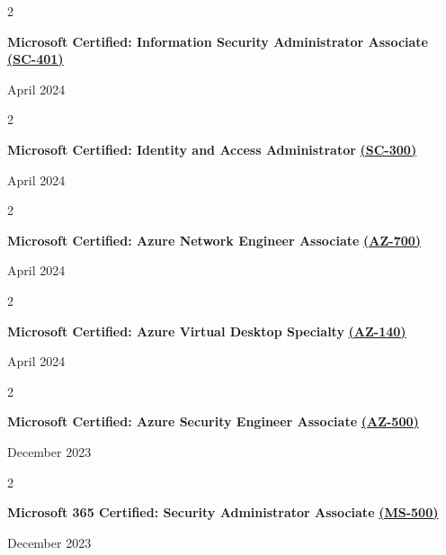 \documentclass[10pt, letterpaper]{article}
\newenvironment{twocolentry}[2][]{
    \onecolentry
    \def\secondColumn{#2}
    \setcolumnwidth{\fill, 4.5 cm}
    \begin{paracol}{2}
}{
    \switchcolumn \raggedleft \secondColumn
    \end{paracol}
    \endonecolentry
}
\begin{document}
\vspace{0.2 cm}

\begin{twocolentry}{April 2024}
    \textbf{Microsoft Certified: Information Security Administrator Associate} \href{https://learn.microsoft.com/api/credentials/share/en-in/ChinmayDhokMAQSoftware-5822/175A9EF2AB5B5B56?sharingId=BC2982D57159EF1A}{\textbf{(SC-401)}}
\end{twocolentry}

\vspace{0.05 cm}
\begin{twocolentry}{April 2024}
    \textbf{Microsoft Certified: Identity and Access Administrator} \href{https://learn.microsoft.com/en-us/users/chinmaydhokmaqsoftware-5822/credentials/82be0c3d23d052b8}{\textbf{(SC-300)}}
\end{twocolentry}

\vspace{0.05 cm}
\begin{twocolentry}{April 2024}
    \textbf{Microsoft Certified: Azure Network Engineer Associate} \href{https://learn.microsoft.com/en-us/users/ChinmayDhokMAQSoftware-5822/credentials/4244163FEBBEDDAF}{\textbf{(AZ-700)}}
\end{twocolentry}

\vspace{0.05 cm}
\begin{twocolentry}{April 2024}
    \textbf{Microsoft Certified: Azure Virtual Desktop Specialty} \href{https://learn.microsoft.com/en-us/users/chinmaydhokmaqsoftware-5822/credentials/ccf1857230b93a53}{\textbf{(AZ-140)}}
\end{twocolentry}

\vspace{0.05 cm}
\begin{twocolentry}{December 2023}
    \textbf{Microsoft Certified: Azure Security Engineer Associate} \href{https://learn.microsoft.com/en-us/users/ChinmayDhokMAQSoftware-5822/credentials/AB3913F87040CE9}{\textbf{(AZ-500)}}
\end{twocolentry}

\vspace{0.05 cm}
\begin{twocolentry}{December 2023}
    \textbf{Microsoft 365 Certified: Security Administrator Associate} \href{https://learn.microsoft.com/en-us/users/chinmaydhokmaqsoftware-5822/credentials/c0ae1a2902b51750}{\textbf{(MS-500)}}
\end{twocolentry}
\end{document}

